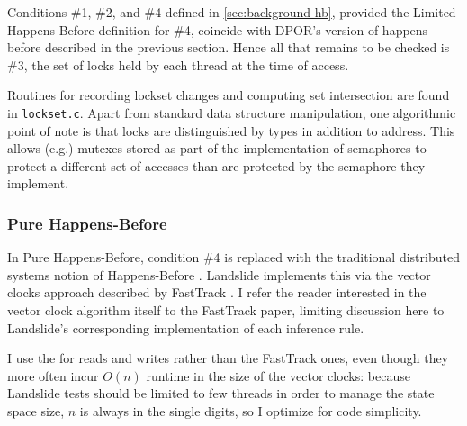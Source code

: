 Conditions \#1, \#2, and \#4 defined in \cref{sec:background-hb},
provided the Limited Happens-Before definition for \#4,
coincide with DPOR's version of happens-before described in the previous section.
Hence all that remains to be checked is \#3, the set of locks held by each thread at the time of access.

Routines for recording lockset changes and computing set intersection are found in {\tt lockset.c}.
Apart from standard data structure manipulation,
one algorithmic point of note is that locks are distinguished by types in addition to address.
This allows (e.g.) mutexes stored as part of the implementation of semaphores to protect a different set of accesses than are protected by the semaphore they implement.


\subsubsection{Pure Happens-Before}
\label{sec:landslide-phb}

In Pure Happens-Before,
condition \#4 is replaced with the traditional distributed systems notion of Happens-Before \cite{lamport-clocks}.
Landslide implements this via the vector clocks approach described by {\sc FastTrack} \cite{fasttrack}.
I refer the reader interested in the vector clock algorithm itself to the {\sc FastTrack} paper,
limiting discussion here to Landslide's corresponding implementation of each inference rule.

I use the 
for reads and writes rather than the {\sc FastTrack} ones,
even though they more often incur $O(n)$ runtime in the size of the vector clocks:
because Landslide tests should be limited to few threads in order to manage the state space size,
$n$ is always in the single digits, so I optimize for code simplicity.

